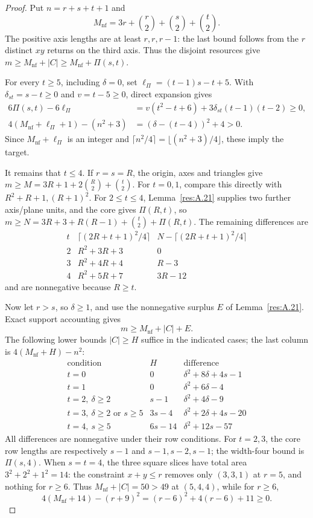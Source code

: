 \documentclass[11pt]{article}
\theoremstyle{definition}
\theoremstyle{remark}
\theoremstyle{plain}
\begin{document}
\begin{proof}
Put $n=r+s+t+1$ and
\[
 M_{\mathrm{nf}}=3r+\binom r2+\binom s2+\binom t2.
\]
The positive axis lengths are at least $r,r,r-1$: the last bound
follows from the $r$ distinct $xy$ returns on the third axis.
Thus the disjoint resources give $m\ge M_{\mathrm{nf}}+|C|\ge M_{\mathrm{nf}}+\Pi(s,t)$.

For every $t\ge5$, including $\delta=0$, set $\ell_{\Pi}=(t-1)s-t+5$.
With $\delta_{st}=s-t\ge0$ and $v=t-5\ge0$, direct expansion gives
\[
\begin{split}
 6\Pi(s,t)-6\ell_{\Pi}
 &=v(t^2-t+6)+3\delta_{st}(t-1)(t-2)\ge0,\\
 4(M_{\mathrm{nf}}+\ell_{\Pi}+1)-(n^2+3)&=(\delta-(t-4))^2+4>0.
\end{split}
\]
Since $M_{\mathrm{nf}}+\ell_{\Pi}$ is an integer and
$\lceil n^2/4\rceil=\lfloor(n^2+3)/4\rfloor$, these imply the target.

It remains that $t\le4$.  If $r=s=R$, the origin, axes and triangles
give $m\ge M=3R+1+2\binom R2+\binom t2$.
For $t=0,1$, compare this directly with $R^2+R+1,(R+1)^2$.
For $2\le t\le4$, Lemma~\ref{res:A.21} supplies two further axis/plane units,
and the core gives $\Pi(R,t)$, so
$m\ge N=3R+3+R(R-1)+\binom t2+\Pi(R,t)$.
The remaining differences are
\[
\begin{array}{c|c|c}
 t&\lceil(2R+t+1)^2/4\rceil&N-\lceil(2R+t+1)^2/4\rceil\\\hline
 2&R^2+3R+3&0\\
 3&R^2+4R+4&R-3\\
 4&R^2+5R+7&3R-12
\end{array}
\]
and are nonnegative because $R\ge t$.

Now let $r>s$, so $\delta\ge1$, and use the nonnegative surplus $E$ of
Lemma~\ref{res:A.21}.  Exact support accounting gives
\[
 m\ge M_{\mathrm{nf}}+|C|+E.\tag{3.9}\label{eq:capacity-9}
\]
The following lower bounds $|C|\ge H$ suffice in the indicated cases;
the last column is $4(M_{\mathrm{nf}}+H)-n^2$:
\[
\begin{array}{c|c|c}
 \text{condition}&H&\text{difference}\\\hline
 t=0&0&\delta^2+8\delta+4s-1\\
 t=1&0&\delta^2+6\delta-4\\
 t=2,\ \delta\ge2&s-1&\delta^2+4\delta-9\\
 t=3,\ \delta\ge2\text{ or }s\ge5&3s-4&\delta^2+2\delta+4s-20\\
 t=4,\ s\ge5&6s-14&\delta^2+12s-57
\end{array}
\]
All differences are nonnegative under their row conditions.
For $t=2,3$, the core row lengths are respectively $s-1$ and
$s-1,s-2,s-1$; the width-four bound is $\Pi(s,4)$.
When $s=t=4$, the three square slices have total area
$3^2+2^2+1^2=14$: the constraint $x+y\le r$ removes only
$(3,3,1)$ at $r=5$, and nothing for $r\ge6$.
Thus $M_{\mathrm{nf}}+|C|=50>49$ at $(5,4,4)$, while for $r\ge6$,
\[
 4(M_{\mathrm{nf}}+14)-(r+9)^2=(r-6)^2+4(r-6)+11\ge0.
\]


\end{proof}
\end{document}
